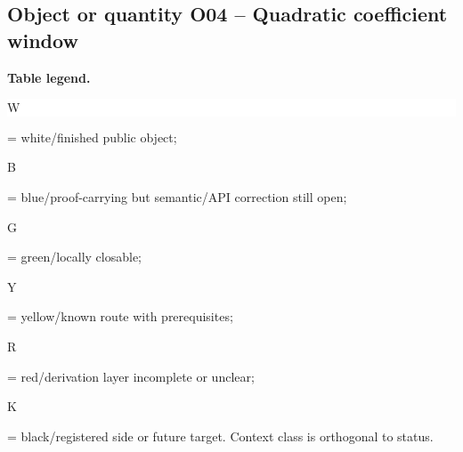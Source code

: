 \subsection*{Object or quantity O04 -- Quadratic coefficient window}
\hypertarget{objproof:O04}{}
\par\smallskip\noindent\begin{minipage}{0.99\linewidth}\footnotesize\raggedright\textbf{Table legend.} \colorbox{white}{\strut W} = white/finished public object; \colorbox{cyan!20}{\strut B} = blue/proof-carrying but semantic/API correction still open; \colorbox{green!18}{\strut G} = green/locally closable; \colorbox{yellow!25}{\strut Y} = yellow/known route with prerequisites; \colorbox{red!20}{\strut R} = red/derivation layer incomplete or unclear; \colorbox{black!18}{\strut K} = black/registered side or future target. Context class is orthogonal to status.\end{minipage}\par\vspace{0.25em}
